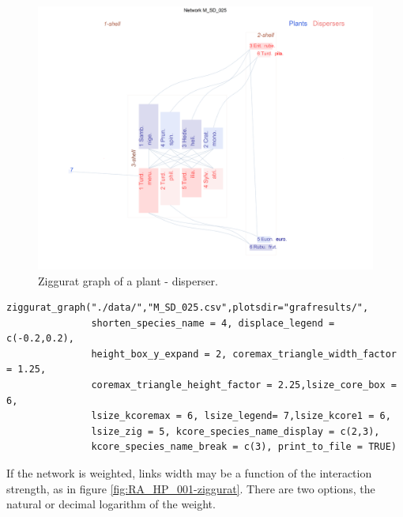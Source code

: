 \documentclass[12pt]{article}
\begin{document}
\begin{figure}[hp!]
\centering
\includegraphics[scale=0.4]{M_SD_025_ziggurat.png}
\caption {Ziggurat graph of a plant - disperser.}
\label{fig:KMAN_ziggurat_025}
\end{figure}

\fontsize{3.5mm}{3.5mm}\selectfont
\begin{verbatim}
ziggurat_graph("./data/","M_SD_025.csv",plotsdir="grafresults/",
               shorten_species_name = 4, displace_legend = c(-0.2,0.2),
               height_box_y_expand = 2, coremax_triangle_width_factor = 1.25,
               coremax_triangle_height_factor = 2.25,lsize_core_box = 6,
               lsize_kcoremax = 6, lsize_legend= 7,lsize_kcore1 = 6, 
               lsize_zig = 5, kcore_species_name_display = c(2,3), 
               kcore_species_name_break = c(3), print_to_file = TRUE)

\end{verbatim}
\normalsize

\clearpage

If the network is weighted, links width may be a function of the interaction strength, as in figure \ref{fig:RA_HP_001-ziggurat}. There are two options, the natural or decimal logarithm of the weight.
\end{document}
